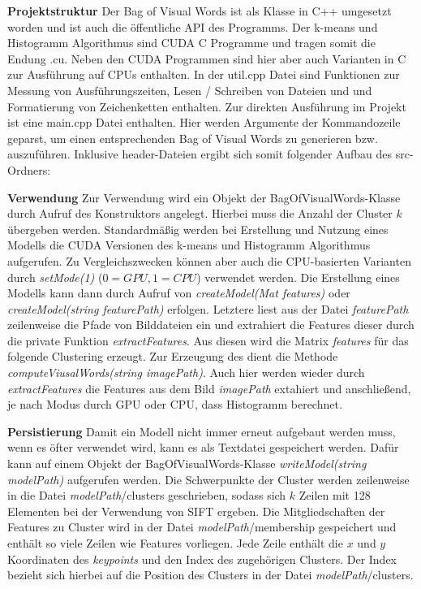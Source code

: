 \textbf{Projektstruktur} Der Bag of Visual Words ist als Klasse in C++ umgesetzt worden und ist auch die öffentliche API des Programms. Der k-means und Histogramm Algorithmus sind CUDA C Programme und tragen somit die Endung .cu. Neben den CUDA Programmen sind hier aber auch Varianten in C zur Ausführung auf CPUs enthalten. In der util.cpp Datei sind Funktionen zur Messung von Ausführungszeiten, Lesen / Schreiben von Dateien und und Formatierung von Zeichenketten enthalten. Zur direkten Ausführung im Projekt ist eine main.cpp Datei enthalten. Hier werden Argumente der Kommandozeile geparst, um einen entsprechenden Bag of Visual Words zu generieren bzw. auszuführen. Inklusive header-Dateien ergibt sich somit folgender Aufbau des src-Ordners:

\textbf{Verwendung} Zur Verwendung wird ein Objekt der BagOfVisualWords-Klasse durch Aufruf des Konstruktors angelegt. Hierbei muss die Anzahl der Cluster $k$ übergeben werden. Standardmäßig werden bei Erstellung und Nutzung eines Modells die CUDA Versionen des k-means und Histogramm Algorithmus aufgerufen. Zu Vergleichszwecken können aber auch die CPU-basierten Varianten durch \textit{setMode(1)} ($0 = GPU, 1 = CPU$) verwendet werden. Die Erstellung eines Modells kann dann durch Aufruf von \textit{createModel(Mat features)} oder \textit{createModel(string featurePath)} erfolgen. Letztere liest aus der Datei \textit{featurePath} zeilenweise die Pfade von Bilddateien ein und extrahiert die Features dieser durch die private Funktion \textit{extractFeatures}. Aus diesen wird die Matrix \textit{features} für das folgende Clustering erzeugt.
Zur Erzeugung des  dient die Methode \textit{computeViusalWords(string imagePath)}. Auch hier werden wieder durch \textit{extractFeatures} die Features aus dem Bild \textit{imagePath} extahiert und anschließend, je nach Modus durch GPU oder CPU, dass Histogramm berechnet. 

\textbf{Persistierung} Damit ein Modell nicht immer erneut aufgebaut werden muss, wenn es öfter verwendet wird, kann es als Textdatei gespeichert werden. Dafür kann auf einem Objekt der BagOfVisualWords-Klasse \textit{writeModel(string modelPath)} aufgerufen werden. Die Schwerpunkte der Cluster werden zeilenweise in die Datei \textit{modelPath}/clusters geschrieben, sodass sich $k$ Zeilen mit 128 Elementen bei der Verwendung von SIFT ergeben. Die Mitgliedschaften der Features zu Cluster wird in der Datei \textit{modelPath}/membership gespeichert und enthält so viele Zeilen wie Features vorliegen. Jede Zeile enthält die $x$ und $y$ Koordinaten des \textit{keypoints} und den Index des zugehörigen Clusters. Der Index bezieht sich hierbei auf die Position des Clusters in der Datei \textit{modelPath}/clusters.

